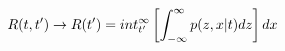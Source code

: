 \begin{equation}
R(t,t') \to R(t') = \\int_{t'}^\infty \left[ \int_{-\infty}^\infty p(z,x|t) dz \right] dx
\end{equation}